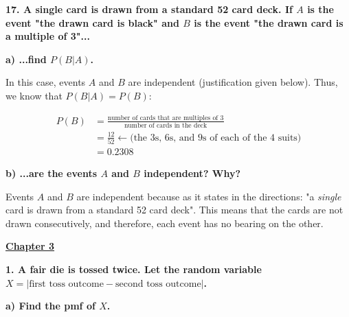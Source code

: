 \documentclass[12pt, letterpaper]{article}
\begin{document}
\textbf{17. A single card is drawn from a standard 52 card deck.  If $A$ is the event "the drawn card is black" and $B$ is the event "the drawn card is a multiple of 3"...}

\qquad \textbf{a) ...find $P(B|A)$.}

\begin{center}
	In this case, events $A$ and $B$ are independent (justification given below). Thus, we know that $P(B|A) = P(B)$:
\end{center}
\begin{align*}
	P(B) &= \frac{\text{number of cards that are multiples of 3}}{\text{number of cards in the deck}} \\
	&= \frac{12}{52} \leftarrow \text{(the 3s, 6s, and 9s of each of the 4 suits)}\\
	&= \boxed{0.2308}
\end{align*}

\pagebreak

\qquad \textbf{b) ...are the events $A$ and $B$ independent? Why?}

\begin{center}
	Events $A$ and $B$ are independent because as it states in the directions: "a \textit{single} card is drawn from a standard 52 card deck". This means that the cards are not drawn consecutively, and therefore, each event has no bearing on the other.
\end{center}

\begin{center}
	\underline{\textbf{Chapter 3}}
\end{center}

\textbf{1. A fair die is tossed twice. Let the random variable $X = |\text{first toss outcome} - \text{second toss outcome}|$.}

\qquad \textbf{a) Find the pmf of $X$.}
\end{document}
